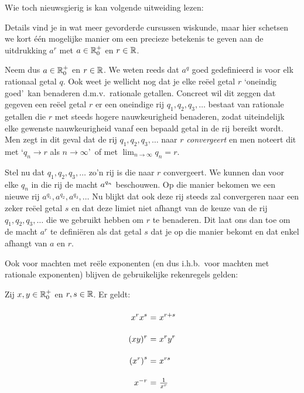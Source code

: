 \documentclass{ximera}
\begin{document}
Wie toch nieuwsgierig is kan volgende uitweiding lezen:


\begin{uitweiding}

Details vind je in wat meer gevorderde cursussen wiskunde, maar hier schetsen we kort \'{e}\'{e}n mogelijke manier om een precieze betekenis te geven
aan de uitdrukking $a^r$ met $a\in\mathbb{R}_0^+$ en $r\in\mathbb{R}$.

Neem dus $a\in\mathbb{R}_0^+$ en $r\in\mathbb{R}$. We weten reeds dat $a^q$
goed gedefinieerd is voor elk rationaal getal $q$. Ook weet je
wellicht nog dat je elke re\"eel getal $r$ \lq oneindig goed\rq\
kan benaderen d.m.v.~rationale getallen. Concreet wil dit zeggen
dat gegeven een re\"eel getal $r$ er een oneindige rij
$q_1,q_2,q_3,\ldots$ bestaat van rationale getallen die $r$ met
steeds hogere nauwkeurigheid benaderen, zodat uiteindelijk elke
gewenste nauwkeurigheid vanaf een bepaald getal in de rij bereikt
wordt. Men zegt in dit geval dat de rij $q_1,q_2,q_3,\ldots$ naar
$r$ \emph{convergeert} en men noteert dit met \lq $q_n\to r$ als
$n\to\infty$\rq\ of met $\lim_{n\to\infty}q_n=r$.

Stel nu dat $q_1,q_2,q_3,\ldots$ zo'n rij is die naar $r$
convergeert. We kunnen dan voor elke $q_n$ in die rij de macht
$\displaystyle a^{q_n}$ beschouwen. Op die manier bekomen we een nieuwe rij
$a^{q_1},a^{q_2},a^{q_3},\ldots$ Nu blijkt dat ook deze rij steeds
zal convergeren naar een zeker re\"eel getal $s$ en dat deze
limiet niet afhangt van de keuze van de rij $q_1,q_2,q_3,\ldots$
die we gebruikt hebben  om $r$ te benaderen. Dit laat ons dan toe
om de macht $a^r$ te defini\"eren als dat getal $s$ dat je op die
manier bekomt en dat enkel afhangt van $a$ en $r$.

\end{uitweiding}

Ook voor machten met re\"ele exponenten (en dus i.h.b.~voor
machten met rationale exponenten) blijven de gebruikelijke
rekenregels  gelden:

\begin{proposition}
	Zij $x,y\in\mathbb{R}_0^+$ en $r,s\in\mathbb{R}$. Er geldt:
	\[
	\arraycolsep=1.4pt\def\arraystretch{2.2}
	\begin{array}{r@{\ =\ }l}
	\ds{x^{r}x^{s}}&\ds{x^{r+s}}\\
	\ds{(xy)^r}&\ds{x^ry^r}\\
	\ds{\left(x^{r}\right)^{s}}&\ds{x^{rs}}\\
	x^{-r} & \frac{1}{x^r} \\
	\end{array}
	\]
\end{proposition}
\end{document}

